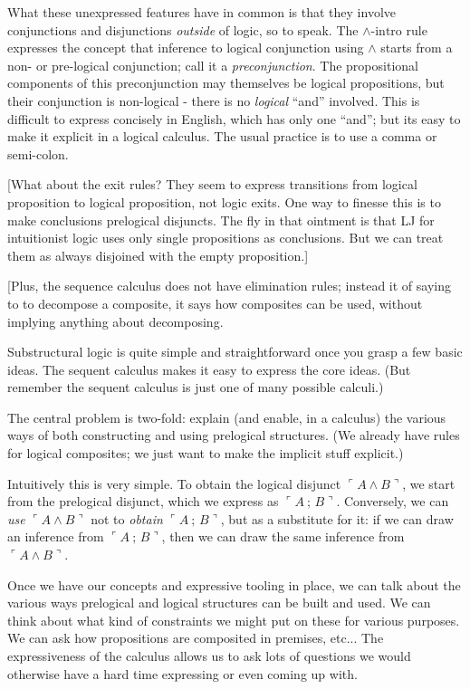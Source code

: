 \documentclass{article}
\begin{document}
What these unexpressed features have in common is that they involve
conjunctions and disjunctions \textit{outside} of logic, so to speak.
The \(\land\text{-intro}\) rule expresses the concept that inference
to logical conjunction using \(\land\) starts from a non- or
pre-logical conjunction; call it a \textit{preconjunction}. The
propositional components of this preconjunction may themselves be
logical propositions, but their conjunction is non-logical - there is
no \textit{logical} ``and'' involved. This is difficult to express
concisely in English, which has only one ``and''; but its easy to make
it explicit in a logical calculus. The usual practice is to use a
comma or semi-colon.

[What about the exit rules? They seem to express transitions from
  logical proposition to logical proposition, not logic exits. One way
  to finesse this is to make conclusions prelogical disjuncts. The fly
  in that ointment is that LJ for intuitionist logic uses only single
  propositions as conclusions. But we can treat them as always
  disjoined with the empty proposition.]

[Plus, the sequence calculus does not have elimination rules; instead
  it of saying to to decompose a composite, it says how composites can
  be used, without implying anything about decomposing.

Substructural logic is quite simple and straightforward once you grasp
a few basic ideas. The sequent calculus makes it easy to express the
core ideas. (But remember the sequent calculus is just one of many
possible calculi.)

The central problem is two-fold: explain (and enable, in a calculus)
the various ways of both constructing and using prelogical structures.
(We already have rules for logical composites; we just want to make
the implicit stuff explicit.)

Intuitively this is very simple. To obtain the logical disjunct
\(\ulcorner A\land B\urcorner\), we start from the prelogical
disjunct, which we express as \(\ulcorner A\ ;\, B\urcorner\).
Conversely, we can \textit{use} \(\ulcorner A\land B\urcorner\) not to
\textit{obtain} \(\ulcorner A\ ;\, B\urcorner\), but as a substitute
for it: if we can draw an inference from \(\ulcorner A\ ;\,
B\urcorner\), then we can draw the same inference from \(\ulcorner
A\land B\urcorner\).

Once we have our concepts and expressive tooling in place, we can talk
about the various ways prelogical and logical structures can be built
and used. We can think about what kind of constraints we might put on
these for various purposes. We can ask how propositions are composited
in premises, etc... The expressiveness of the calculus allows us to
ask lots of questions we would otherwise have a hard time expressing
or even coming up with.
\end{document}
